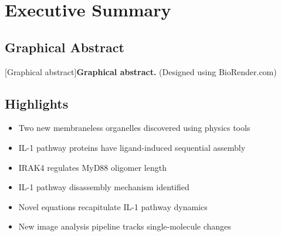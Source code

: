 \chapter*{Executive Summary}
\section{Graphical Abstract}

\begin{centering}
\captionsetup{parbox=none}
[Graphical abstract]{\textbf{Graphical abstract.} (Designed using BioRender.com)}
\label{img:Graphical_Abstract}
\end{centering}

\section{Highlights}
\begin{itemize}
\item Two new membraneless organelles discovered using physics tools
\item IL-1 pathway proteins have ligand-induced sequential assembly
\item IRAK4 regulates MyD88 oligomer length
\item IL-1 pathway disassembly mechanism identified
\item Novel equations recapitulate IL-1 pathway dynamics
\item New image analysis pipeline tracks single-molecule changes
\end{itemize}

